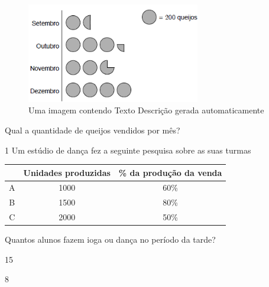 {{{\begin{escolha}
{{{{\begin{escolha}
\begin{escolha}
{\begin{figure}
\centering
\includegraphics[width=2.97917in,height=1.71639in]{./_SAEB_9_MAT/media/image223.png}
\caption{Uma imagem contendo Texto Descrição gerada automaticamente}
\end{figure}


Qual a quantidade de queijos vendidos por mês?



\num{1}
  Um estúdio de dança fez a seguinte pesquisa sobre as suas turmas 

\begin{table}[]
\begin{tabular}{c|c|c}
\hline
\rowcolor[HTML]{C0C0C0} 
\multicolumn{1}{|c|}{\cellcolor[HTML]{C0C0C0}\textbf{Montadora}} & \textbf{Unidades produzidas} & \multicolumn{1}{c|}{\cellcolor[HTML]{C0C0C0}\textbf{\% da produção da venda}} \\ \hline
A & 1000 & 60\% \\ \hline
B & 1500 & 80\% \\ \hline
C & 2000 & 50\% \\ \hline
\end{tabular}
\end{table}

Quantos alunos fazem ioga ou dança no período da tarde?

\begin{escolha}

  \item 15

  \item 8


\end{escolha}}
\end{escolha}
\end{escolha}}}}}
\end{escolha}}}}
